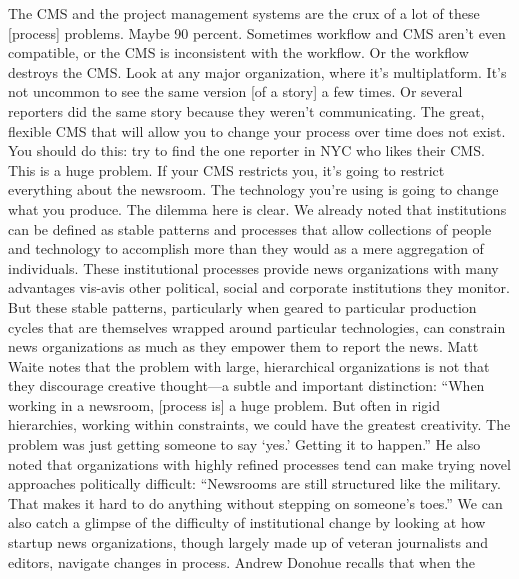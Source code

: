 The CMS and the project management systems are the crux of a lot
of these [process] problems. Maybe 90 percent. Sometimes workflow
and CMS aren’t even compatible, or the CMS is inconsistent with the
workflow. Or the workflow destroys the CMS. Look at any major organization,
where it’s multiplatform. It’s not uncommon to see the same
version [of a story] a few times. Or several reporters did the same story
because they weren’t communicating. The great, flexible CMS that will
allow you to change your process over time does not exist. You should
do this: try to find the one reporter in NYC who likes their CMS. This
is a huge problem. If your CMS restricts you, it’s going to restrict everything
about the newsroom. The technology you’re using is going to
change what you produce.
The dilemma here is clear. We already noted that institutions can be defined as
stable patterns and processes that allow collections of people and technology to
accomplish more than they would as a mere aggregation of individuals. These
institutional processes provide news organizations with many advantages vis-avis
other political, social and corporate institutions they monitor. But these stable
patterns, particularly when geared to particular production cycles that are themselves
wrapped around particular technologies, can constrain news organizations
as much as they empower them to report the news.
Matt Waite notes that the problem with large, hierarchical organizations is not
that they discourage creative thought—a subtle and important distinction:
``When working in a newsroom, [process is] a huge problem. But often in rigid
hierarchies, working within constraints, we could have the greatest creativity.
The problem was just getting someone to say ‘yes.’ Getting it to happen.'' He
also noted that organizations with highly refined processes tend can make trying
novel approaches politically difficult: ``Newsrooms are still structured like the
military. That makes it hard to do anything without stepping on someone’s toes.''
We can also catch a glimpse of the difficulty of institutional change by looking
at how startup news organizations, though largely made up of veteran journalists
and editors, navigate changes in process. Andrew Donohue recalls that when the

